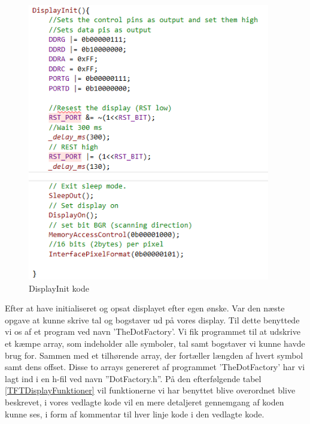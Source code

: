 \begin{figure}[H]
	\centering
	\includegraphics[width = 300pt]{Img/DisplayInit_Code.png}
	\caption{DisplayInit kode}
	\label{fig:DisplayInit_Code}
\end{figure}


Efter at have initialiseret og opsat displayet efter egen ønske. Var den næste opgave at kunne skrive tal og bogstaver ud på vores display. Til dette benyttede vi os af et program ved navn ’TheDotFactory’. Vi fik programmet til at udskrive et kæmpe array, som indeholder alle symboler, tal samt bogstaver vi kunne havde brug for. Sammen med et tilhørende array, der fortæller længden af hvert symbol samt dens offset. Disse to arrays genereret af programmet ’TheDotFactory’ har vi lagt ind i en h-fil ved navn ”DotFactory.h”.
På den efterfølgende tabel \autoref{TFTDisplayFunktioner} vil funktionerne vi har benyttet blive overordnet blive beskrevet, i vores vedlagte kode vil en mere detaljeret gennemgang af koden kunne ses, i form af kommentar til hver linje kode i den vedlagte kode. 

\newpage

